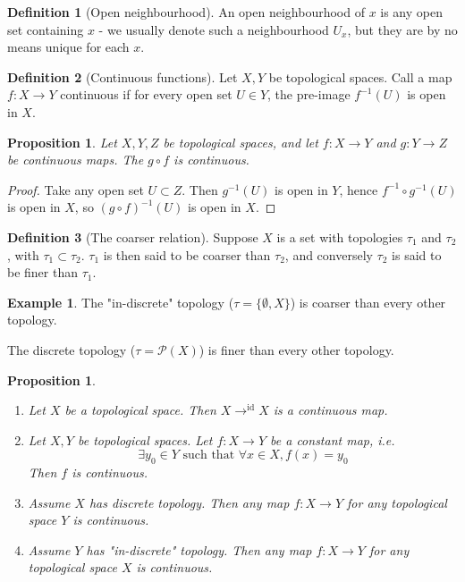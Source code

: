 \documentclass{article}
\theoremstyle{definition}
\newtheorem{defn}{Definition}[section]
\newtheorem{exmp}{Example}[section]
\theoremstyle{plain}%
\newtheorem{prop}[thm]{Proposition}
\theoremstyle{remark}
\begin{document}
\begin{defn}[Open neighbourhood]
    An open neighbourhood of $x$ is any open set containing $x$ - we usually denote such a neighbourhood $U_x$, but they are by no means unique for each $x$.
\end{defn}

\begin{defn}[Continuous functions]
Let $X,Y$ be topological spaces. Call a map $f: X \to Y$ continuous if for every open set $U \in Y$, the pre-image $f^{-1}(U)$ is open in $X$.
\end{defn}

\begin{prop}
Let $X,Y,Z$ be topological spaces, and let $f: X \to Y$ and $g : Y \to Z$ be continuous maps. The $g \circ f$ is continuous.
\end{prop}

\begin{proof}
Take any open set $U \subset Z$. Then $g^{-1}(U)$ is open in $Y$, hence $f^{-1} \circ g^{-1}(U)$ is open in $X$, so $(g \circ f)^{-1}(U)$ is open in $X$.
\end{proof}

\begin{defn}[The coarser relation]
Suppose $X$ is a set with topologies $\tau_1$ and $\tau_2$, with $\tau_1 \subset \tau_2$. $\tau_1$ is then said to be coarser than $\tau_2$, and conversely $\tau_2$ is said to be finer than $\tau_1$.
\end{defn}

\begin{exmp}
The "in-discrete" topology ($\tau = \{ \emptyset, X \}$) is coarser than every other topology. 

The discrete topology ($\tau = \mathcal{P}(X)$) is finer than every other topology. 
\end{exmp}

\begin{prop}
\begin{enumerate}
    \item Let $X$ be a topological space. Then $X \to^{\text{id}} X$ is a continuous map.
    \item Let $X, Y$ be topological spaces. Let $f : X \to Y$ be a constant map, i.e.
    \[ \exists y_0 \in Y \text{ such that } \forall x \in X, f(x) = y_0 \]
    Then $f$ is continuous.
    \item Assume $X$ has discrete topology. Then any map $f: X \to Y$ for any topological space $Y$ is continuous.
    \item Assume $Y$ has "in-discrete" topology. Then any map $f: X \to Y$ for any topological space $X$ is continuous.
\end{enumerate}
\end{prop}
\end{document}
